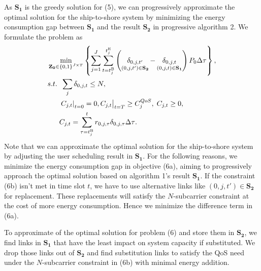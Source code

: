 \documentclass[conference]{IEEEtran}
\begin{document}
As ${{\mathbf{S}}_{\mathbf{1}}}$ is the greedy solution for (5), we can progressively approximate the optimal solution for the ship-to-shore system by minimizing the energy consumption gap between ${{\mathbf{S}}_{\mathbf{1}}}$ and the result ${{\mathbf{S}}_{\mathbf{2}}}$ in progressive algorithm 2. We formulate the problem as
\begin{subequations}
\begin{align}
  & \mathop {\min }\limits_{{{\mathbf{Z}}_{\mathbf{0}}} \in {{\left\{ {0,1} \right\}}^{J \times T}}} \left\{ {\sum\limits_{j = 1}^J {\sum\limits_{t = {t_j^{{\rm{B}}}}}^{t_j^{{\rm{E}}}} {\left( {\mathop {\delta _{0,j,t'}}\limits_{\left( {0,j,t'} \right) \in {{\mathbf{S}}_{\mathbf{2}}}}  - \mathop {\delta _{0,j,t} }\limits_{\left( {0,j,t} \right) \in {{\mathbf{S}}_{\mathbf{1}}}} } \right){P_{0}}\Delta \tau }} } \right\}, \\
  & {s.t.} \;\; \sum\limits_j  { {{\delta _{0,j,t}}} }  \le N, \\
& \;\;\;\;\;\; {\left. {{{\left. {{C_{j,t}}} \right|}_{t = 0}} = 0, {C_{j,t}}} \right|_{t = T}} \ge C_j^{QoS},\; {C_{j,t}} \ge 0, \\
& \;\;\;\;\;\; {C_{j,t}} = \sum\limits_{\tau  = {t_j^{{\rm{B}}}}}^t {{r_{0,j,\tau }}\delta _{0,j,\tau}\Delta \tau }.
\end{align}
\end{subequations}
Note that we can approximate the optimal solution for the ship-to-shore system by adjusting the user scheduling result in ${{\mathbf{S}}_{\mathbf{1}}}$. For the following reasons, we minimize the energy consumption gap in objective (6a), aiming to progressively approach the optimal solution based on algorithm 1's result ${{\mathbf{S}}_{\mathbf{1}}}$. 
If the constraint (6b) isn't met in time slot ${t}$, we have to use alternative links like $\left( {0,j,t'} \right) \in {{\mathbf{S}}_{\mathbf{2}}}$ for replacement. These replacements will satisfy the $N$-subcarrier constraint at the cost of more energy consumption. Hence we minimize the difference term in (6a). %


To approximate of the optimal solution for problem (6) and store them in ${{\mathbf{S}}_{\mathbf{2}}}$, we find links in ${{\mathbf{S}}_{\mathbf{1}}}$ that have the least impact on system capacity if substituted. We drop those links out of ${{\mathbf{S}}_{\mathbf{2}}}$ and find substitution links to satisfy the QoS need under the $N$-subcarrier constraint in (6b) with minimal energy addition. 
\end{document}
